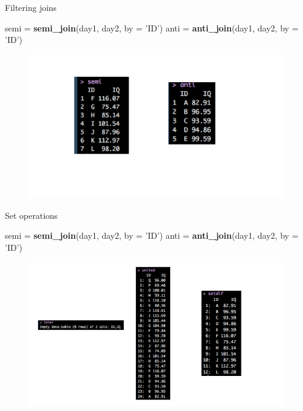 \documentclass[ignorenonframetext,]{beamer}
\newenvironment{Shaded}{\begin{snugshade}}{\end{snugshade}}
\newcommand{\KeywordTok}[1]{\textcolor[rgb]{0.13,0.29,0.53}{\textbf{#1}}}
\newcommand{\DataTypeTok}[1]{\textcolor[rgb]{0.13,0.29,0.53}{#1}}
\newcommand{\StringTok}[1]{\textcolor[rgb]{0.31,0.60,0.02}{#1}}
\newcommand{\NormalTok}[1]{#1}
\begin{document}
\begin{frame}[fragile]{Filtering joins}

\begin{Shaded}
\begin{Highlighting}[]
\NormalTok{semi =}\StringTok{ }\KeywordTok{semi_join}\NormalTok{(day1, day2, }\DataTypeTok{by =} \StringTok{'ID'}\NormalTok{)}
\NormalTok{anti =}\StringTok{ }\KeywordTok{anti_join}\NormalTok{(day1, day2, }\DataTypeTok{by =} \StringTok{'ID'}\NormalTok{)}
\end{Highlighting}
\end{Shaded}

\begin{figure}
\centering
\includegraphics{graphs/filter.png}
\caption{}
\end{figure}

\end{frame}

\begin{frame}[fragile]{Set operations}

\begin{Shaded}
\begin{Highlighting}[]
\NormalTok{semi =}\StringTok{ }\KeywordTok{semi_join}\NormalTok{(day1, day2, }\DataTypeTok{by =} \StringTok{'ID'}\NormalTok{)}
\NormalTok{anti =}\StringTok{ }\KeywordTok{anti_join}\NormalTok{(day1, day2, }\DataTypeTok{by =} \StringTok{'ID'}\NormalTok{)}
\end{Highlighting}
\end{Shaded}

\begin{figure}
\centering
\includegraphics{graphs/set.png}
\caption{}
\end{figure}

\end{frame}
\end{document}
